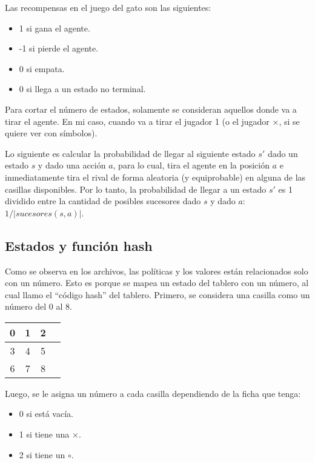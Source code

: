 \documentclass{article}
\begin{document}
Las recompensas en el juego del gato son las siguientes:

\begin{itemize}
\item 1 si gana el agente.
\item -1 si pierde el agente.
\item 0 si empata.
\item 0 si llega a un estado no terminal.
\end{itemize}

Para cortar el número de estados, solamente se consideran aquellos donde va a tirar el agente. En mi caso, cuando va a tirar el jugador 1 (o el jugador $\times$, si se quiere ver con símbolos).

Lo siguiente es calcular la probabilidad de llegar al siguiente estado $s'$ dado un estado $s$ y dado una acción $a$, para lo cual, tira el agente en la posición $a$ e inmediatamente tira el rival de forma aleatoria (y equiprobable) en alguna de las casillas disponibles. Por lo tanto, la probabilidad de llegar a un estado $s'$ es 1 dividido entre la cantidad de posibles sucesores dado $s$ y dado $a$: $1/|sucesores(s, a)|$.

\subsection{Estados y función hash}

Como se observa en los archivos, las políticas y los valores están relacionados solo con un número. Esto es porque se mapea un estado del tablero con un número, al cual llamo el ``código hash'' del tablero. Primero, se considera una casilla como un número del 0 al 8.

\begin{center}
\begin{tabular}{|c|c|c|c|}
\hline
0 & 1 & 2 \\ \hline
3 & 4 & 5 \\ \hline
6 & 7 & 8 \\ \hline
\end{tabular}
\end{center}

Luego, se le asigna un número a cada casilla dependiendo de la ficha que tenga:

\begin{itemize}
\item 0 si está vacía.
\item 1 si tiene una $\times$.
\item 2 si tiene un $\circ$.
\end{itemize}
\end{document}
